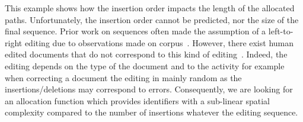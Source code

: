 This example shows how the insertion order impacts the length of the allocated
paths. Unfortunately, the insertion order cannot be predicted, nor the size of
the final sequence. Prior work on sequences often made the assumption of a
left-to-right editing due to observations made on
corpus~\cite{preguica2009commutative, weiss2009logoot}. However, there exist
human edited documents that do not correspond to this kind of
editing~\cite{nedelec2013lseq}. Indeed, the editing depends on the type of the
document and to the activity for example when correcting a document the editing
in mainly random as the insertions/deletions may correspond to
errors. Consequently, we are looking for an allocation function which provides
identifiers with a sub-linear spatial complexity compared to the number of
insertions whatever the editing sequence.

 
